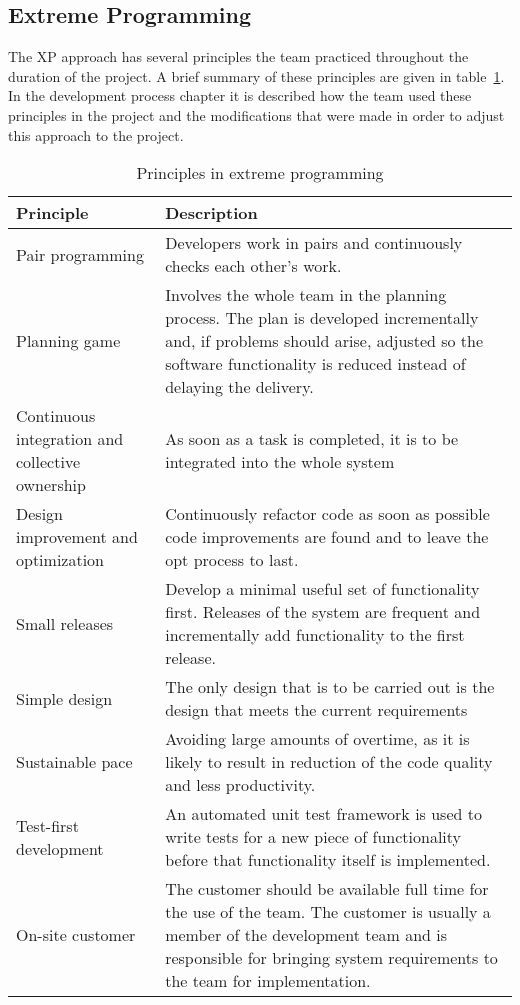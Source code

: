 \subsection{Extreme Programming}
The XP approach has several principles the team practiced throughout the duration of the project. A brief summary of these principles are given in table~\ref{tab:exProg}. In the development process chapter it is described how the team used these principles in the project and the modifications that were made in order to adjust this approach to the project.

\begin{table}[H]
\begin{tabular}{|p{4cm}|p{11.7cm}|}
\hline
Principle & Description \\\hline
Pair programming & Developers work in pairs and continuously checks each other's work.\\\hline
Planning game & Involves the whole team in the planning process. The plan is developed incrementally and, if problems should arise, adjusted so the software functionality is reduced instead of delaying the delivery.
\\\hline
Continuous integration and collective ownership& As soon as a task is completed, it is to be integrated into the whole system\\\hline
Design improvement and optimization & Continuously refactor code as soon as possible code improvements are found and to leave the \gls{opt} process to last. \\\hline
Small releases & Develop a minimal useful set of functionality first. Releases of the system are frequent and incrementally add functionality to the first release.\\\hline
Simple design & The only design that is to be carried out is the design that meets the current requirements\\\hline
Sustainable pace & Avoiding large amounts of overtime, as it is likely to result in reduction of the code quality and less productivity. \\\hline
Test-first development & An automated unit test framework is used to write tests for a new piece of functionality before that functionality itself is implemented. \\\hline
On-site customer & The customer should be available full time for the use of the team. The customer is usually a member of the development team and is responsible for bringing system requirements to the team for implementation.\\\hline
\end{tabular}
\caption{Principles in extreme programming}
\label{tab:exProg}
\end{table}